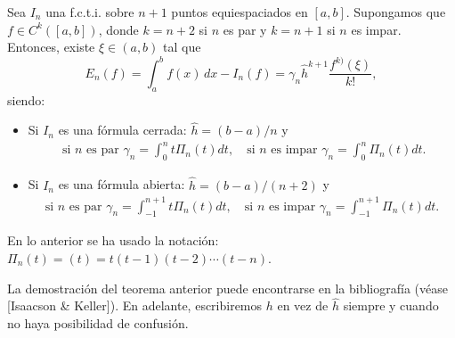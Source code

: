 \begin{theorem}
  \label{thm:error.formulas-nc}
  Sea $I_n$ una f.c.t.i. sobre $n+1$ puntos equiespaciados en
  $[a,b]$. Supongamos que $f\in C^k([a,b])$, donde $k=n+2$ si $n$ es par
  y $k=n+1$ si $n$ es impar. Entonces, existe $\xi\in(a,b)$ tal que
  \begin{equation}
  \label{eq:error-formulas-nc} 
  E_n(f)=\int_a^bf(x)\,dx - I_n(f)
    = \gamma_n \widehat h^{k+1} \frac{f^{k)}(\xi)}{k!},
  \end{equation}
  siendo:
  \begin{itemize}
  \item Si $I_n$ es una fórmula cerrada: $\widehat h=(b-a)/n$ y
    \begin{align*}
      \text{ si $n$ es par }
      \gamma_n=\int_0^n t \Pi_n(t) dt,
      \quad \text{si $n$ es impar }
          \gamma_n=\int_0^n \Pi_n(t) dt.
    \end{align*}
  \item Si $I_n$ es una fórmula abierta: $\widehat h=(b-a)/(n+2)$ y
    \begin{align*}
      \text{si $n$ es par }
      \gamma_n=\int_{-1}^{n+1} t \Pi_n(t) dt,
      \quad \text{si $n$ es impar }
      \gamma_n=\int_{-1}^{n+1} \Pi_n(t) dt.
    \end{align*}
  \end{itemize}
  En lo anterior se ha usado la notación:
  $\Pi_n(t)=(t)=t(t-1)(t-2)\cdots (t-n)$.
\end{theorem}

La demostración del teorema anterior puede encontrarse en la
bibliografía (véase [Isaacson \& Keller]).  En adelante, escribiremos
$h$ en vez de $\widehat h$ siempre y cuando no haya posibilidad de
confusión.

